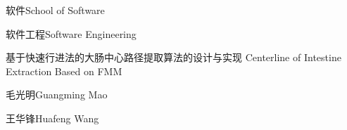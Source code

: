 
\school
{软件}{School of Software}

\major
{软件工程}{Software Engineering}

\thesistitle
{基于快速行进法的大肠中心路径提取算法的设计与实现}
{}
{Centerline of Intestine Extraction Based on FMM}
{}

\thesisauthor
{毛光明}{Guangming Mao}

\teacher
{王华锋}{Huafeng Wang}







